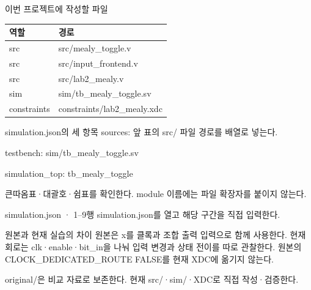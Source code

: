 \begin{frame}{이번 프로젝트에 작성할 파일}
\small
\begin{center}\renewcommand{\arraystretch}{1.55}\begin{tabular}{ll}
역할 & 경로\\\hline
src & src/mealy\_toggle.v\\
src & src/input\_frontend.v\\
src & src/lab2\_mealy.v\\
sim & sim/tb\_mealy\_toggle.sv\\
constraints & constraints/lab2\_mealy.xdc\\
\end{tabular}\end{center}
\end{frame}

\begin{frame}{simulation.json의 세 항목}
\small
sources: 앞 표의 src/ 파일 경로를 배열로 넣는다.\par\vspace{0.26cm}testbench: sim/tb\_mealy\_toggle.sv\par\vspace{0.26cm}simulation\_top: tb\_mealy\_toggle\par\vspace{0.26cm}큰따옴표·대괄호·쉼표를 확인한다. module 이름에는 파일 확장자를 붙이지 않는다.\par
\end{frame}

\begin{frame}{simulation.json · 1–9행}
\small
simulation.json를 열고 해당 구간을 직접 입력한다.\par\vspace{0.4cm}\par\vspace{0.4cm}
\end{frame}

\begin{frame}{원본과 현재 실습의 차이}
\small
원본은 x를 클록과 조합 출력 입력으로 함께 사용한다. 현재 회로는 clk·enable·bit\_in을 나눠 입력 변경과 상태 전이를 따로 관찰한다. 원본의 CLOCK\_DEDICATED\_ROUTE FALSE를 현재 XDC에 옮기지 않는다.\par\vspace{0.26cm}original/은 비교 자료로 보존한다. 현재 src/·sim/·XDC로 직접 작성·검증한다.\par
\end{frame}

